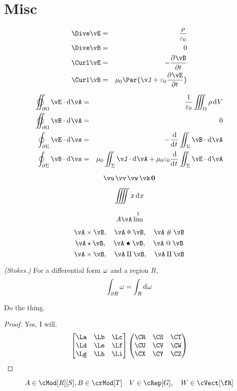 \documentclass[11pt]{article}
\begin{document}
\section*{Misc}

\usevec

\begin{eqnarray*}
    \Dive\vE &=& \frac{\rho}{\ep_0} \\
    \Dive\vB &=& 0 \\
    \Curl\vE &=& -\pd{\vB}{t} \\
    \Curl\vB &=& \mu_0\Par{\vJ + \ep_0\pd{\vE}{t}}
\end{eqnarray*}

\useveca

\begin{eqnarray*}
    \varoiint_{\del\Om} \vE\cdot\D\vA &=& \frac{1}{\ep_0} \iiint_\Om \rho\D V \\
    \varoiint_{\del\Om} \vB\cdot\D\vA &=& 0 \\
    \oint_{\del\Si} \vE\cdot\D \vs &=& -\od{}{t}\iint_\Si \vB\cdot\D\vA \\
    \oint_{\del\Si} \vB\cdot\D \vs &=& 
        \mu_0\iint_\Si\vJ\cdot\D\vA + \mu_0\ep_0\od{}{t}\iint_\Si\vE\cdot\D\vA 
\end{eqnarray*}

\[ \vu\,\vv\,\vw\,\vk\,\vzero \]

\[ \iiiint x \D x\]

\[ A\vA\lim^1 \]

\[ \vA \times \vB,\quad \vA \smashtimes \vB,\quad \vA \hash \vB \]
\[ \vA \star \vB,\quad \vA \fatstar \vB,\quad \vA \at \vB \]
\[ \vA \prd \vB,\quad \vA \coprd \vB,\quad \vA \amalg \vB \]

\begin{thm*} {\em (Stokes.)}
    For a differential form $\omega$ and a region $R$, 
    \[ \int_{\del R}\om = \int_R \D \om \]
\end{thm*}


\begin{psetProblem}
    Do the thing.
    \begin{proof}
        Yes, I will.
        \[ 
            \bthree{\La}{\Lb}{\Lc}{\Ld}{\Le}{\Lf}{\Lg}{\Lh}{\Li}
            \pthree{\CR}{\CS}{\CT}{\CU}{\CV}{\CW}{\CX}{\CY}{\CZ} 
        \]
    \end{proof}
\end{psetProblem}

\[ A \in \cMod[R][S], B \in \crMod[T] \quad V \in \cRep[G], \quad W \in \cVect[\R] \]
\end{document}
